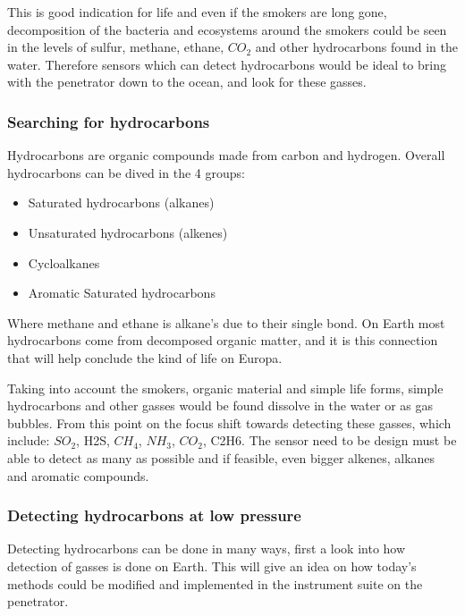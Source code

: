 This is good indication for life and even if the smokers are long gone, decomposition of the bacteria and ecosystems around the smokers could be seen in the levels of sulfur, methane, ethane, $CO_2$ and other hydrocarbons found in the water. Therefore sensors which can detect hydrocarbons would be ideal to bring with the penetrator down to the ocean, and look for these gasses.

\subsubsection{Searching for hydrocarbons}

Hydrocarbons are organic compounds made from carbon and hydrogen. Overall hydrocarbons can be dived in the 4 groups:
\begin{itemize}
  \item Saturated hydrocarbons (alkanes)
  \item Unsaturated hydrocarbons (alkenes)
  \item Cycloalkanes
  \item Aromatic Saturated hydrocarbons
\end{itemize}
Where methane and ethane is alkane's due to their single bond. On Earth most hydrocarbons come from decomposed organic matter, and it is this connection that will help conclude the kind of life on Europa.

Taking into account the smokers, organic material and simple life forms, simple hydrocarbons and other gasses would be found dissolve in the water or as gas bubbles. From this point on the focus shift towards detecting these gasses, which include: $SO_2$, H2S, $CH_4$, $NH_3$, $CO_2$, C2H6. The sensor need to be design must be able to detect as many as possible and if feasible, even bigger alkenes, alkanes and aromatic compounds.

\subsubsection{Detecting hydrocarbons at low pressure}

Detecting hydrocarbons can be done in many ways, first a look into how detection of gasses is done on Earth. This will give an idea on how today's methods could be modified and implemented in the instrument suite on the penetrator.

